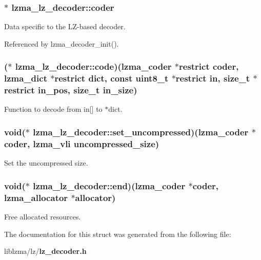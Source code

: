 \subsubsection[{coder}]{$\ast$ lzma\-\_\-lz\-\_\-decoder\-::coder}\label{structlzma__lz__decoder_a5b50be2297affc6fb47c009cb4277884}


Data specific to the L\-Z-\/based decoder. 



Referenced by lzma\-\_\-decoder\-\_\-init().

\subsubsection[{code}]{($\ast$ lzma\-\_\-lz\-\_\-decoder\-::code)({\bf lzma\-\_\-coder} $\ast$restrict {\bf coder}, {\bf lzma\-\_\-dict} $\ast$restrict dict, const uint8\-\_\-t $\ast$restrict in, size\-\_\-t $\ast$restrict in\-\_\-pos, size\-\_\-t in\-\_\-size)}\label{structlzma__lz__decoder_a2e3b7949ab8df43749fcd26c99b228ea}


Function to decode from in[] to $\ast$dict. 

\subsubsection[{set\-\_\-uncompressed}]{\setlength{\rightskip}{0pt plus 5cm}void($\ast$ lzma\-\_\-lz\-\_\-decoder\-::set\-\_\-uncompressed)({\bf lzma\-\_\-coder} $\ast${\bf coder}, {\bf lzma\-\_\-vli} uncompressed\-\_\-size)}\label{structlzma__lz__decoder_abba54b3588630b71d044816a870506c5}


Set the uncompressed size. 

\subsubsection[{end}]{\setlength{\rightskip}{0pt plus 5cm}void($\ast$ lzma\-\_\-lz\-\_\-decoder\-::end)({\bf lzma\-\_\-coder} $\ast${\bf coder}, {\bf lzma\-\_\-allocator} $\ast$allocator)}\label{structlzma__lz__decoder_a1e0487215df66d57eecbba5df881a2e8}


Free allocated resources. 



The documentation for this struct was generated from the following file\-:\begin{DoxyCompactItemize}
\item 
liblzma/lz/{\bf lz\-\_\-decoder.\-h}\end{DoxyCompactItemize}
